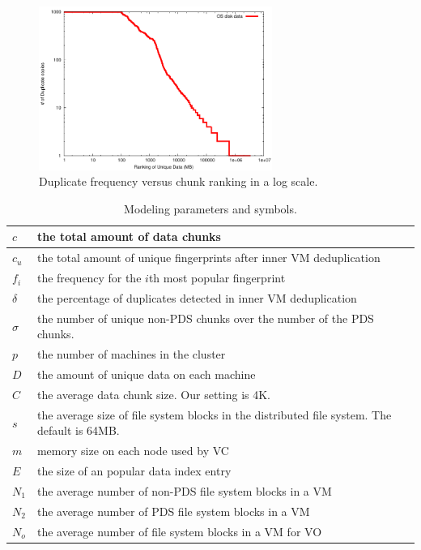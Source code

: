 \begin{figure}
\centering
 \includegraphics[width=3in]{figures/log-log-disk}
\caption{Duplicate frequency versus  chunk ranking in a log scale.}
\label{fig:Datazipf}
\end{figure}

\begin{table}[ht]
\centering
\begin{tabular}{|p{1.25cm}|p{6.5cm}|}
\hline
$c$ &  the total amount of data chunks\\ 
\hline
$c_u$ &  the total amount of unique fingerprints after inner VM  deduplication\\
\hline
$f_i$ &  the frequency for the $i$th most popular fingerprint\\
\hline
$\delta$ &  the percentage of duplicates detected in inner VM deduplication\\
\hline
$\sigma$ &  the number of unique non-PDS chunks over  the number of the PDS chunks.\\
\hline
$p$ & the number of machines in the cluster\\
\hline
$D$ & the amount of unique data on each machine\\
\hline
$C$ & the average data chunk size. Our setting is  4K.\\
\hline
$s$ & the average size of file system blocks in the distributed file system. The default is  64MB.\\
\hline
$m$ & memory size on each node used by VC\\ 
\hline
$E$ & the size of an popular data index entry\\
\hline
$N_1$ & the average number  of non-PDS file system blocks  in a VM\\
\hline
$N_2$ & the average number  of PDS file system blocks  in a VM\\
\hline
$N_o$ & the average number  of file system blocks  in a VM for VO\\
\hline
\end{tabular}
\caption{Modeling  parameters and symbols.}
\label{tab:symbol}
\end{table}

